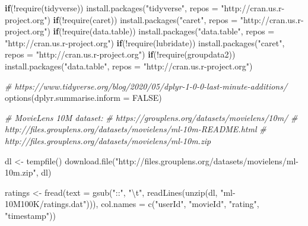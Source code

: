 \documentclass[
]{article}
\newenvironment{Shaded}{}{}
\newcommand{\AttributeTok}[1]{\textcolor[rgb]{0.49,0.56,0.16}{#1}}
\newcommand{\CommentTok}[1]{\textcolor[rgb]{0.38,0.63,0.69}{\textit{#1}}}
\newcommand{\ConstantTok}[1]{\textcolor[rgb]{0.53,0.00,0.00}{#1}}
\newcommand{\ControlFlowTok}[1]{\textcolor[rgb]{0.00,0.44,0.13}{\textbf{#1}}}
\newcommand{\FunctionTok}[1]{\textcolor[rgb]{0.02,0.16,0.49}{#1}}
\newcommand{\NormalTok}[1]{#1}
\newcommand{\OtherTok}[1]{\textcolor[rgb]{0.00,0.44,0.13}{#1}}
\newcommand{\SpecialCharTok}[1]{\textcolor[rgb]{0.25,0.44,0.63}{#1}}
\newcommand{\StringTok}[1]{\textcolor[rgb]{0.25,0.44,0.63}{#1}}
\begin{document}
\begin{Shaded}
\begin{Highlighting}[]
\ControlFlowTok{if}\NormalTok{(}\SpecialCharTok{!}\FunctionTok{require}\NormalTok{(tidyverse)) }\FunctionTok{install.packages}\NormalTok{(}\StringTok{"tidyverse"}\NormalTok{, }\AttributeTok{repos =} \StringTok{"http://cran.us.r{-}project.org"}\NormalTok{)}
\ControlFlowTok{if}\NormalTok{(}\SpecialCharTok{!}\FunctionTok{require}\NormalTok{(caret)) }\FunctionTok{install.packages}\NormalTok{(}\StringTok{"caret"}\NormalTok{, }\AttributeTok{repos =} \StringTok{"http://cran.us.r{-}project.org"}\NormalTok{)}
\ControlFlowTok{if}\NormalTok{(}\SpecialCharTok{!}\FunctionTok{require}\NormalTok{(data.table)) }\FunctionTok{install.packages}\NormalTok{(}\StringTok{"data.table"}\NormalTok{, }\AttributeTok{repos =} \StringTok{"http://cran.us.r{-}project.org"}\NormalTok{)}
\ControlFlowTok{if}\NormalTok{(}\SpecialCharTok{!}\FunctionTok{require}\NormalTok{(lubridate)) }\FunctionTok{install.packages}\NormalTok{(}\StringTok{"caret"}\NormalTok{, }\AttributeTok{repos =} \StringTok{"http://cran.us.r{-}project.org"}\NormalTok{)}
\ControlFlowTok{if}\NormalTok{(}\SpecialCharTok{!}\FunctionTok{require}\NormalTok{(groupdata2)) }\FunctionTok{install.packages}\NormalTok{(}\StringTok{"data.table"}\NormalTok{, }\AttributeTok{repos =} \StringTok{"http://cran.us.r{-}project.org"}\NormalTok{)}

\CommentTok{\# https://www.tidyverse.org/blog/2020/05/dplyr{-}1{-}0{-}0{-}last{-}minute{-}additions/}
\FunctionTok{options}\NormalTok{(}\AttributeTok{dplyr.summarise.inform =} \ConstantTok{FALSE}\NormalTok{)}

\CommentTok{\# MovieLens 10M dataset:}
\CommentTok{\# https://grouplens.org/datasets/movielens/10m/}
\CommentTok{\# http://files.grouplens.org/datasets/movielens/ml{-}10m{-}README.html}
\CommentTok{\# http://files.grouplens.org/datasets/movielens/ml{-}10m.zip}

\NormalTok{dl }\OtherTok{\textless{}{-}} \FunctionTok{tempfile}\NormalTok{()}
\FunctionTok{download.file}\NormalTok{(}\StringTok{"http://files.grouplens.org/datasets/movielens/ml{-}10m.zip"}\NormalTok{, dl)}

\NormalTok{ratings }\OtherTok{\textless{}{-}} \FunctionTok{fread}\NormalTok{(}\AttributeTok{text =} \FunctionTok{gsub}\NormalTok{(}\StringTok{"::"}\NormalTok{, }\StringTok{"}\SpecialCharTok{\textbackslash{}t}\StringTok{"}\NormalTok{, }\FunctionTok{readLines}\NormalTok{(}\FunctionTok{unzip}\NormalTok{(dl, }\StringTok{"ml{-}10M100K/ratings.dat"}\NormalTok{))),}
                 \AttributeTok{col.names =} \FunctionTok{c}\NormalTok{(}\StringTok{"userId"}\NormalTok{, }\StringTok{"movieId"}\NormalTok{, }\StringTok{"rating"}\NormalTok{, }\StringTok{"timestamp"}\NormalTok{))}


\end{Highlighting}
\end{Shaded}
\end{document}
